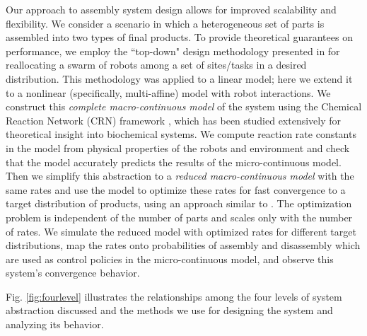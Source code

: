 

Our approach to assembly system design allows for improved
scalability and flexibility. We consider a scenario in which a
heterogeneous set of parts is assembled into two types of final
products.  To provide theoretical guarantees on performance, we
employ the ``top-down" design methodology presented in
\cite{Berman:2006p10108, bib:berman2, Halasz:2007p10106} for
reallocating a swarm of robots among a set of sites/tasks in a
desired distribution.  This methodology was applied to a linear
model; here we extend it to a nonlinear (specifically, multi-affine)
model with robot interactions.  We construct this {\it complete
macro-continuous model} of the system using the Chemical Reaction
Network (CRN) framework
\cite{Feinberg:1979p10907,JamesWilkinson:2006p10341}, which has been
studied extensively for theoretical insight into biochemical
systems. We compute reaction rate constants in the model from
physical properties of the robots and environment and check that the
model accurately predicts the results of the micro-continuous model.
Then we simplify this abstraction to a {\it reduced macro-continuous
model} with the same rates and use the model to optimize these rates
for fast convergence to a target distribution of products, using an
approach similar to \cite{bib:BermanCDC08, ref:BermanTRO08}. The
optimization problem is independent of the number of parts and
scales only with the number of rates.  We simulate the reduced model
with optimized rates for different target distributions, map the
rates onto probabilities of assembly and disassembly which are used
as control policies in the micro-continuous model, and observe this
system's convergence behavior.

Fig. \ref{fig:fourlevel} illustrates the relationships among the
four levels of system abstraction discussed and the methods we use
for designing the system and analyzing its behavior.

